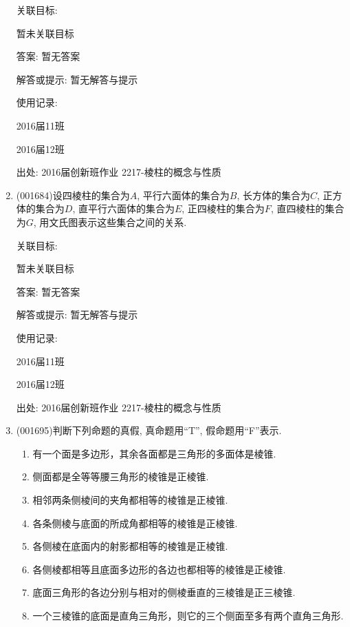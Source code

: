 \documentclass[10pt,a4paper]{article}
\newcommand{\blank}[1]{\underline{\hbox to #1pt{}}}
\begin{document}
\begin{enumerate}[1.]
关联目标:

暂未关联目标

答案: 暂无答案

解答或提示: 暂无解答与提示

使用记录:

2016届11班								

2016届12班								


出处: 2016届创新班作业	2217-棱柱的概念与性质
\item { (001684)}设四棱柱的集合为$A$, 平行六面体的集合为$B$, 长方体的集合为$C$, 正方体的集合为$D$,
直平行六面体的集合为$E$, 正四棱柱的集合为$F$, 直四棱柱的集合为$G$, 用文氏图表示这些集合之间的关系.


关联目标:

暂未关联目标

答案: 暂无答案

解答或提示: 暂无解答与提示

使用记录:

2016届11班	

2016届12班	


出处: 2016届创新班作业	2217-棱柱的概念与性质
\item { (001695)}判断下列命题的真假, 真命题用``{\textrm T}'', 假命题用``{\textrm F}''表示.\\ 
\begin{enumerate}[\blank{30}(1)]
\item 有一个面是多边形，其余各面都是三角形的多面体是棱锥.\\ 
\item 侧面都是全等等腰三角形的棱锥是正棱锥.\\ 
\item 相邻两条侧棱间的夹角都相等的棱锥是正棱锥.\\ 
\item 各条侧棱与底面的所成角都相等的棱锥是正棱锥.\\ 
\item 各侧棱在底面内的射影都相等的棱锥是正棱锥.\\ 
\item 各侧棱都相等且底面多边形的各边也都相等的棱锥是正棱锥.\\ 
\item 底面三角形的各边分别与相对的侧棱垂直的三棱锥是正三棱锥.\\ 
\item 一个三棱锥的底面是直角三角形，则它的三个侧面至多有两个直角三角形.
\end{enumerate}



\end{enumerate}
\end{document}
